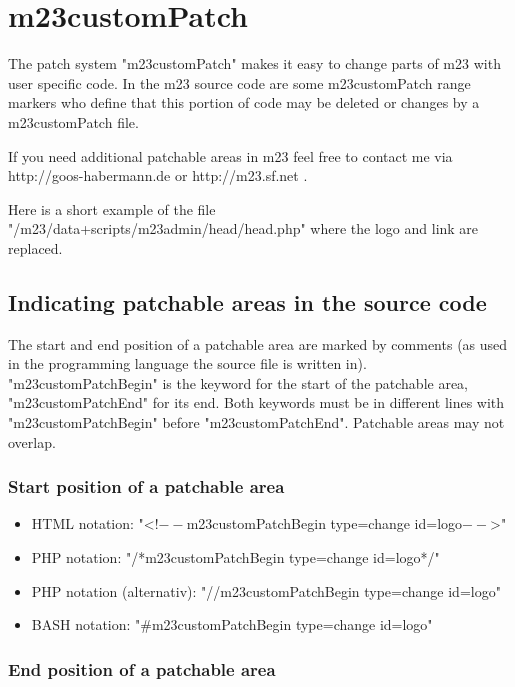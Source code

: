 \chapter{m23customPatch}
\label{m23customPatch}
The patch system "m23customPatch" makes it easy to change parts of m23 with user specific code. In the m23 source code are some m23customPatch range markers who define that this portion of code may be deleted or changes by a m23customPatch file.

If you need additional patchable areas in m23 feel free to contact me via http://goos-habermann.de or http://m23.sf.net .

Here is a short example of the file "/m23/data+scripts/m23admin/head/head.php" where the logo and link are replaced.





\section{Indicating patchable areas in the source code}
The start and end position of a patchable area are marked by comments (as used in the programming language the source file is written in). "m23customPatchBegin" is the keyword for the start of the patchable area, "m23customPatchEnd" for its end. Both keywords must be in different lines with "m23customPatchBegin" before "m23customPatchEnd". Patchable areas may not overlap.

\subsection{Start position of a patchable area}

\begin{itemize}
	\item HTML notation: "<!$--$m23customPatchBegin type=change id=logo$--$>"
	\item PHP notation: "/*m23customPatchBegin type=change id=logo*/"
	\item PHP notation (alternativ): "//m23customPatchBegin type=change id=logo"
	\item BASH notation: "#m23customPatchBegin type=change id=logo"
\end{itemize}

\subsection{End position of a patchable area}

